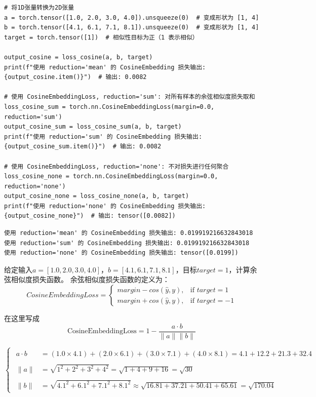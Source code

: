 \begin{enumerate}[label=\arabic*)]
\begin{lstlisting}[style=pythonstyle]
# 将1D张量转换为2D张量
a = torch.tensor([1.0, 2.0, 3.0, 4.0]).unsqueeze(0)  # 变成形状为 [1, 4]
b = torch.tensor([4.1, 6.1, 7.1, 8.1]).unsqueeze(0)  # 变成形状为 [1, 4]
target = torch.tensor([1])  # 相似性目标为正（1 表示相似）

output_cosine = loss_cosine(a, b, target)
print(f"使用 reduction='mean' 的 CosineEmbedding 损失输出: {output_cosine.item()}")  # 输出: 0.0082

# 使用 CosineEmbeddingLoss, reduction='sum': 对所有样本的余弦相似度损失取和
loss_cosine_sum = torch.nn.CosineEmbeddingLoss(margin=0.0, reduction='sum')
output_cosine_sum = loss_cosine_sum(a, b, target)
print(f"使用 reduction='sum' 的 CosineEmbedding 损失输出: {output_cosine_sum.item()}")  # 输出: 0.0082

# 使用 CosineEmbeddingLoss, reduction='none': 不对损失进行任何聚合
loss_cosine_none = torch.nn.CosineEmbeddingLoss(margin=0.0, reduction='none')
output_cosine_none = loss_cosine_none(a, b, target)
print(f"使用 reduction='none' 的 CosineEmbedding 损失输出: {output_cosine_none}")  # 输出: tensor([0.0082])
\end{lstlisting}
\begin{lstlisting}[style=demostyle,numbers=none]
使用 reduction='mean' 的 CosineEmbedding 损失输出: 0.019919216632843018
使用 reduction='sum' 的 CosineEmbedding 损失输出: 0.019919216632843018
使用 reduction='none' 的 CosineEmbedding 损失输出: tensor([0.0199])
\end{lstlisting}

\begin{example}
    \exProblem
    给定输入$a = [1.0, 2.0, 3.0, 4.0]$，$b = [4.1, 6.1, 7.1, 8.1]$，目标$target = 1$，计算余弦相似度损失函数。
    \exSolution
    余弦相似度损失函数的定义为：
    $$CosineEmbeddingLoss=\begin{cases}
    margin-cos(\hat{y},y),& \text{if } target=1\\ 
    margin+cos(\hat{y},y),& \text{if } target=-1
    \end{cases}$$

    在这里写成
    $$\text{CosineEmbeddingLoss}=1-\frac{a\cdot b}{\|a\|\|b\|}$$

    $$\left\{\begin{matrix}
        \begin{aligned}
        a\cdot b&=(1.0\times4.1)+(2.0\times6.1)+(3.0\times7.1)+(4.0\times8.1)=4.1+12.2+21.3+32.4\\
        \\
        \|a\|&=\sqrt{1^2+2^2+3^2+4^2}=\sqrt{1+4+9+16}=\sqrt{30}\\
        \\
        \|b\|&=\sqrt{4.1^2+6.1^2+7.1^2+8.1^2}\approx\sqrt{16.81+37.21+50.41+65.61}=\sqrt{170.04}\end{aligned}
        \end{matrix}\right.$$


\end{example}
\end{enumerate}
